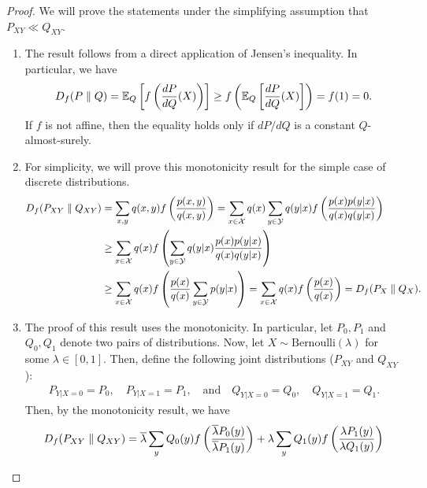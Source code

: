         \begin{proof}
            We will prove the statements under the simplifying assumption that $P_{XY} \ll Q_{XY}$. 
            \begin{enumerate}[label=(\alph*)]
                \item The result follows from a direct application of Jensen's inequality. In particular, we have 
                \begin{align}
                    D_f(P \parallel Q) = \mathbb{E}_Q\left[ f\left( \frac{dP}{dQ}(X) \right) \right] \geq f\left( \mathbb{E}_Q\left[ \frac{dP}{dQ}(X) \right] \right) = f(1) = 0. 
                \end{align}
                If $f$ is not affine, then the equality holds only if $dP/dQ$ is a constant $Q$-almost-surely. 
                \item For simplicity, we will prove this monotonicity result for the simple case of discrete distributions. 
                \begin{align}
                    D_f(P_{XY} \parallel Q_{XY}) &= \sum_{x, y} q(x, y) f\left( \frac{p(x,y)}{q(x,y)} \right)  = \sum_{x \in \mathcal{X}} q(x) \sum_{y \in \mathcal{Y}} q(y|x) f\left( \frac{p(x) p(y|x)}{q(x) q(y|x)} \right)  \\
                    & \geq \sum_{x \in \mathcal{X}} q(x) f \left( \sum_{y \in \mathcal{Y}} q(y|x) \frac{p(x) p(y|x)}{q(x) q(y|x)} \right)  \\ 
                    & \geq \sum_{x \in \mathcal{X}} q(x) f \left( \frac{p(x)}{q(x)} \sum_{y \in \mathcal{Y}} p(y|x) \right)  = \sum_{x \in \mathcal{X}} q(x) f\left( \frac{p(x)}{q(x)} \right) = D_f(P_X \parallel Q_X). 
                \end{align}
                \item The proof of this result uses the monotonicity. In particular, let $P_0, P_1$ and $Q_0, Q_1$ denote two pairs of distributions. Now, let $X \sim \text{Bernoulli}(\lambda)$ for some $\lambda \in [0,1]$. Then, define the following joint distributions ($P_{XY}$ and $Q_{XY}$): 
                \begin{align}
                    P_{Y|X=0} = P_0, \quad P_{Y|X=1} = P_1, \quad \text{and} \quad Q_{Y|X=0} = Q_0, \quad Q_{Y|X=1} = Q_1. 
                \end{align}
                Then, by the monotonicity result, we have 
                \begin{align}
                    D_f(P_{XY} \parallel Q_{XY}) &= \barlambda \sum_{y} Q_0(y) f \lp \frac{\barlambda P_0(y)}{\barlambda P_1(y)} \rp  + \lambda \sum_{y} Q_1(y) f\lp \frac{\lambda P_1(y)}{\lambda Q_1(y)} \rp \\

\end{align}
\end{enumerate}
\end{proof}
